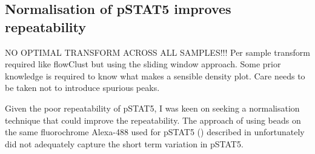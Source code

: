 %

\subsection{Normalisation of pSTAT5 improves repeatability}


NO OPTIMAL TRANSFORM ACROSS ALL SAMPLES!!!
Per sample transform required like flowClust but using the sliding window approach.
Some prior knowledge is required to know what makes a sensible density plot.
Care needs to be taken not to introduce spurious peaks.

Given the poor repeatability of pSTAT5, I was keen on seeking a normalisation technique that could improve the repeatability.
The approach of using beads on the same fluorochrome Alexa-488 used for pSTAT5 () described in 
unfortunately did not adequately capture the short term variation in pSTAT5.

